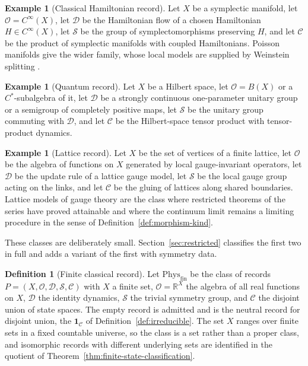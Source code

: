 \documentclass[11pt,letterpaper]{article}
\theoremstyle{definition}
\newtheorem{definition}[theorem]{Definition}
\newtheorem{example}[theorem]{Example}
\theoremstyle{remark}
\begin{document}
\begin{example}[Classical Hamiltonian record]
\label{ex:hamiltonian}
Let $X$ be a symplectic manifold, let $\mathcal{O} = C^\infty(X)$, let $\mathcal{D}$ be the Hamiltonian flow of a chosen Hamiltonian $H \in C^\infty(X)$, let $\mathcal{S}$ be the group of symplectomorphisms preserving $H$, and let $\mathcal{C}$ be the product of symplectic manifolds with coupled Hamiltonians. Poisson manifolds give the wider family, whose local models are supplied by Weinstein splitting \cite{weinstein1983}.
\end{example}

\begin{example}[Quantum record]
\label{ex:quantum}
Let $X$ be a Hilbert space, let $\mathcal{O} = B(X)$ or a $C^*$-subalgebra of it, let $\mathcal{D}$ be a strongly continuous one-parameter unitary group or a semigroup of completely positive maps, let $\mathcal{S}$ be the unitary group commuting with $\mathcal{D}$, and let $\mathcal{C}$ be the Hilbert-space tensor product with tensor-product dynamics.
\end{example}

\begin{example}[Lattice record]
\label{ex:lattice}
Let $X$ be the set of vertices of a finite lattice, let $\mathcal{O}$ be the algebra of functions on $X$ generated by local gauge-invariant operators, let $\mathcal{D}$ be the update rule of a lattice gauge model, let $\mathcal{S}$ be the local gauge group acting on the links, and let $\mathcal{C}$ be the gluing of lattices along shared boundaries. Lattice models of gauge theory are the class where restricted theorems of the series have proved attainable and where the continuum limit remains a limiting procedure in the sense of Definition~\ref{def:morphism-kind}.
\end{example}

These classes are deliberately small. Section~\ref{sec:restricted} classifies the first two in full and adds a variant of the first with symmetry data.

\begin{definition}[Finite classical record]
\label{def:finite-classical}
Let $\mathrm{Phys}_{\mathrm{fin}}$ be the class of records $P = (X, \mathcal{O}, \mathcal{D}, \mathcal{S}, \mathcal{C})$ with $X$ a finite set, $\mathcal{O} = \mathbb{R}^{X}$ the algebra of all real functions on $X$, $\mathcal{D}$ the identity dynamics, $\mathcal{S}$ the trivial symmetry group, and $\mathcal{C}$ the disjoint union of state spaces. The empty record is admitted and is the neutral record for disjoint union, the $\mathbf{1}_{\mathcal{C}}$ of Definition~\ref{def:irreducible}. The set $X$ ranges over finite sets in a fixed countable universe, so the class is a set rather than a proper class, and isomorphic records with different underlying sets are identified in the quotient of Theorem~\ref{thm:finite-state-classification}.
\end{definition}
\end{document}
